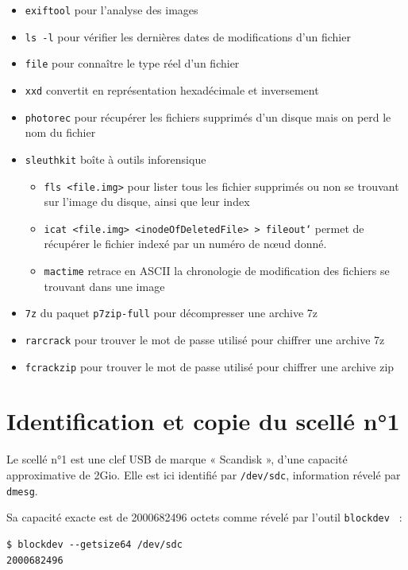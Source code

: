 \documentclass[a4paper,11pt]{article}
\begin{document}
\begin{itemize}
    \item \texttt{exiftool} pour l'analyse des images
    \item \texttt{ls -l} pour vérifier les dernières dates de modifications d'un
        fichier
    \item \texttt{file} pour connaître le type réel d'un fichier
    \item \texttt{xxd} convertit en représentation hexadécimale et inversement
    \item \texttt{photorec} pour récupérer les fichiers supprimés d'un disque
        mais on perd le nom du fichier
    \item \texttt{sleuthkit} boîte à outils inforensique
        \begin{itemize}
            \item \texttt{fls <file.img>} pour lister tous les fichier supprimés
                ou non se trouvant sur l'image du disque, ainsi que leur index
            \item \texttt{icat <file.img> <inodeOfDeletedFile> > fileout`}
                permet de récupérer le fichier indexé par un numéro de nœud
                donné.
            \item {\tt mactime} retrace en ASCII la chronologie de modification
                des fichiers se trouvant dans une image
        \end{itemize}
    \item {\tt 7z} du paquet {\tt p7zip-full} pour décompresser une archive 7z
    \item {\tt rarcrack} pour trouver le mot de passe utilisé pour chiffrer une
        archive 7z
    \item {\tt fcrackzip} pour trouver le mot de passe utilisé pour chiffrer une
        archive zip
\end{itemize}

\section{Identification et copie du scellé n°1}

Le scellé n°1 est une clef USB de marque « Scandisk », d’une capacité
approximative de 2Gio.
Elle est ici identifié par {\tt /dev/sdc}, information révelé par {\tt dmesg}.

Sa capacité exacte est de 2000682496 octets comme révelé par l’outil
{\tt blockdev } :
\begin{verbatim}
$ blockdev --getsize64 /dev/sdc
2000682496
\end{verbatim}
\end{document}
